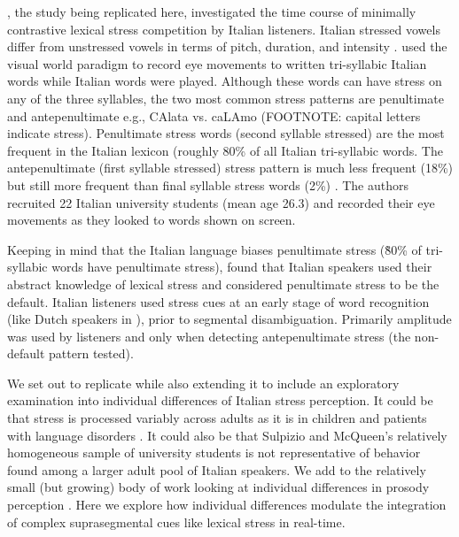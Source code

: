 \cite{Sulpizio_McQueen_2012}, the study being replicated here, investigated the time course of minimally contrastive lexical stress competition by Italian listeners. Italian stressed vowels differ from unstressed vowels in terms of pitch, duration, and intensity \citep{Maturi1998}. \cite{Sulpizio_McQueen_2012} used the visual world paradigm to record eye movements to written tri-syllabic Italian words while Italian words were played. Although these words can have stress on any of the three syllables, the two most common stress patterns are penultimate and antepenultimate e.g., CAlata vs. caLAmo (FOOTNOTE: capital letters indicate stress). Penultimate stress words (second syllable stressed) are the most frequent in the Italian lexicon (roughly 80\% of all Italian tri-syllabic words. The antepenultimate (first syllable stressed) stress pattern is much less frequent (18\%) but still more frequent than final syllable stress words (2\%) \citep{thornton_1997}. The authors recruited 22 Italian university students (mean age 26.3) and recorded their eye movements as they looked to words shown on screen.

Keeping in mind that the Italian language biases penultimate stress (\~80\% of tri-syllabic words have penultimate stress), \cite{Sulpizio_McQueen_2012} found that Italian speakers used their abstract knowledge of lexical stress and considered penultimate stress to be the default. Italian listeners used stress cues at an early stage of word recognition (like Dutch speakers in \cite{Reinisch2010}), prior to segmental disambiguation. Primarily amplitude was used by listeners and only when detecting antepenultimate stress (the non-default pattern tested). 

We set out to replicate \cite{Sulpizio_McQueen_2012}  while also extending it to include an exploratory examination into individual differences of Italian stress perception. It could be that stress is processed variably across adults as it is in children \citep[e.g.,][]{Colombo2014} and patients with language disorders \citep[e.g.,][]{Cappa1997}. It could also be that Sulpizio and McQueen's relatively homogeneous sample of university students is not representative of behavior found among a larger adult pool of Italian speakers. We add to the relatively small (but growing) body of work looking at individual differences in prosody perception \citep[e.g.,][]{Roy2017,Bishop2017,Lameris2023}. Here we explore how individual differences modulate the integration of complex suprasegmental cues like lexical stress in real-time.


